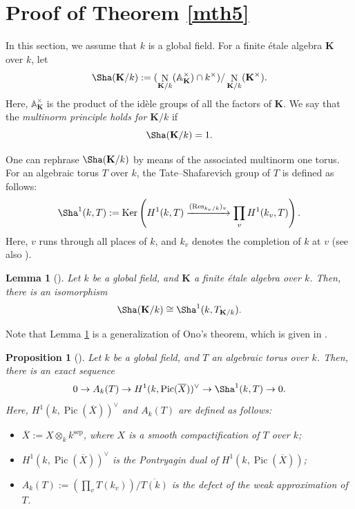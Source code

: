 \documentclass[12pt]{amsart}
\theoremstyle{plain}
\newtheorem{prop}[thm]{Proposition}
\newtheorem{lem}[thm]{Lemma}
\theoremstyle{definition}
\numberwithin{thm}{section}
\numberwithin{equation}{section}
\newcommand{\A}{\mathbb{A}}
\newcommand{\bK}{\mathbf{K}}
\DeclareMathOperator{\Ker}{Ker}
\DeclareMathOperator{\N}{N}
\DeclareMathOperator{\Res}{Res}
\DeclareMathOperator{\Pic}{Pic}
\DeclareMathOperator{\sep}{sep}
\begin{document}
\section{Proof of Theorem \ref{mth5}}\label{sect:pfmn}

In this section, we assume that $k$ is a global field. For a finite {\'e}tale algebra $\bK$ over $k$, let
\begin{equation*}
    \Sha(\bK/k):=(\N_{\bK/k}(\A_{\bK}^{\times})\cap k^{\times})/\N_{\bK/k}(\bK^{\times}). 
\end{equation*}
Here, $\A_{\bK}^{\times}$ is the product of the id{\`e}le groups of all the factors of $\bK$. We say that the \emph{multinorm principle holds for $\bK/k$} if
\begin{equation*}
    \Sha(\bK/k)=1. 
\end{equation*}

One can rephrase $\Sha(\bK/k)$ by means of the associated multinorm one torus. For an algebraic torus $T$ over $k$, the Tate--Shafarevich group of $T$ is defined as follows: 
\begin{equation*}
    \Sha^{1}(k,T):= \Ker \left(H^1(k,T)\xrightarrow{(\Res_{k_{v}/k})_{v}} \prod_{v} H^1(k_v,T)\right). 
\end{equation*}
Here, $v$ runs through all places of $k$, and $k_{v}$ denotes the completion of $k$ at $v$ (see also \cite[Section 6.3]{PR94}). 

\begin{lem}[{\cite[p.~7, (2.5)]{Liang2024}}]\label{lem:gnon}
Let $k$ be a global field, and $\bK$ a finite {\'e}tale algebra over $k$. Then, there is an isomorphism
\begin{equation*}
    \Sha(\bK/k)\cong \Sha^{1}(k,T_{\bK/k}). 
\end{equation*}
\end{lem}

Note that Lemma \ref{lem:gnon} is a generalization of Ono's theorem, which is given in \cite[p.~70]{Ono1963}. 

\begin{prop}[{\cite[p.~1213, Theorem 5]{Voskresenskii1969}}]\label{prop:vskr}
Let $k$ be a global field, and $T$ an algebraic torus over $k$. Then, there is an exact sequence
\begin{equation*}
0\rightarrow A_{k}(T) \rightarrow H^1(k,\Pic(\overline{X}))^{\vee}\rightarrow \Sha^{1}(k,T)\rightarrow 0. 
\end{equation*}
Here, $H^{1}(k,\Pic(\overline{X}))^{\vee}$ and $A_{k}(T)$ are defined as follows: 
\begin{itemize}
    \item $\overline{X}:=X\otimes_{k}k^{\sep}$, where $X$ is a smooth compactification of $T$ over $k$; 
    \item $H^{1}(k,\Pic(\overline{X}))^{\vee}$ is the Pontryagin dual of $H^{1}(k,\Pic(\overline{X}))$; 
    \item $A_{k}(T):=(\prod_{v}T(k_v))/\overline{T(k)}$ is the defect of the weak approximation of $T$.
\end{itemize}
\end{prop}
\end{document}
